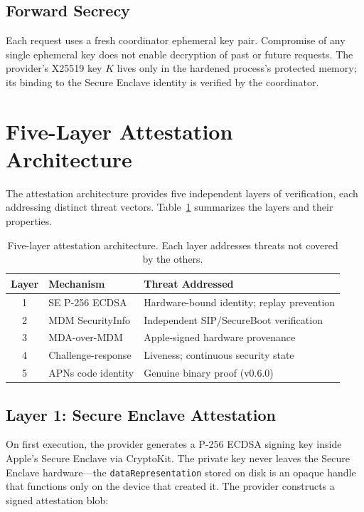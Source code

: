 \documentclass[10pt,twocolumn,letterpaper]{article}
\begin{document}
\subsection{Forward Secrecy}

Each request uses a fresh coordinator ephemeral key pair. Compromise of any single ephemeral key does not enable decryption of past or future requests. The provider's X25519 key $K$ lives only in the hardened process's protected memory; its binding to the Secure Enclave identity is verified by the coordinator.

\section{Five-Layer Attestation Architecture}
\label{sec:attestation}

The attestation architecture provides five independent layers of verification, each addressing distinct threat vectors. Table~\ref{tab:trust-layers} summarizes the layers and their properties.

\begin{table}[h]
\centering
\caption{Five-layer attestation architecture. Each layer addresses threats not covered by the others.}
\label{tab:trust-layers}
\vspace{4pt}
\scriptsize
\begin{tabular}{@{}clp{2.8cm}@{}}
\toprule
\textbf{Layer} & \textbf{Mechanism} & \textbf{Threat Addressed} \\
\midrule
1 & SE P-256 ECDSA & Hardware-bound identity; replay prevention \\
2 & MDM SecurityInfo & Independent SIP/SecureBoot verification \\
3 & MDA-over-MDM & Apple-signed hardware provenance \\
4 & Challenge-response & Liveness; continuous security state \\
5 & APNs code identity & Genuine binary proof (v0.6.0) \\
\bottomrule
\end{tabular}
\end{table}

\subsection{Layer 1: Secure Enclave Attestation}
\label{sec:se-attest}

On first execution, the provider generates a P-256 ECDSA signing key inside Apple's Secure Enclave via CryptoKit. The private key never leaves the Secure Enclave hardware---the \texttt{dataRepresentation} stored on disk is an opaque handle that functions only on the device that created it. The provider constructs a signed attestation blob:
\end{document}
